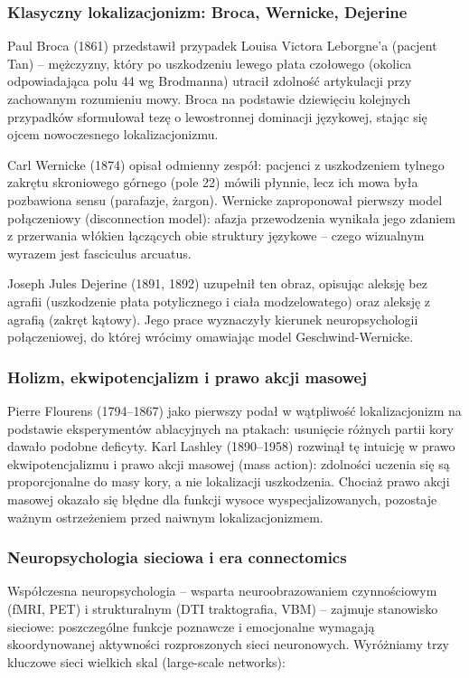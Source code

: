 \documentclass[11pt,a4paper]{article}
\begin{document}
\subsubsection{Klasyczny lokalizacjonizm: Broca, Wernicke, Dejerine}

Paul Broca (1861) przedstawił przypadek Louisa Victora Leborgne'a (pacjent Tan) – mężczyzny, który po
uszkodzeniu lewego płata czołowego (okolica odpowiadająca polu 44 wg Brodmanna) utracił zdolność
artykulacji przy zachowanym rozumieniu mowy. Broca na podstawie dziewięciu kolejnych przypadków
sformułował tezę o lewostronnej dominacji językowej, stając się ojcem nowoczesnego lokalizacjonizmu.

Carl Wernicke (1874) opisał odmienny zespół: pacjenci z uszkodzeniem tylnego zakrętu skroniowego górnego
(pole 22) mówili płynnie, lecz ich mowa była pozbawiona sensu (parafazje, żargon). Wernicke zaproponował
pierwszy model połączeniowy (disconnection model): afazja przewodzenia wynikała jego zdaniem
z przerwania włókien łączących obie struktury językowe – czego wizualnym wyrazem jest fasciculus arcuatus.

Joseph Jules Dejerine (1891, 1892) uzupełnił ten obraz, opisując aleksję bez agrafii (uszkodzenie płata
potylicznego i ciała modzelowatego) oraz aleksję z agrafią (zakręt kątowy). Jego prace wyznaczyły kierunek
neuropsychologii połączeniowej, do której wrócimy omawiając model Geschwind-Wernicke.

\subsubsection{Holizm, ekwipotencjalizm i prawo akcji masowej}

Pierre Flourens (1794–1867) jako pierwszy podał w wątpliwość lokalizacjonizm na podstawie eksperymentów
ablacyjnych na ptakach: usunięcie różnych partii kory dawało podobne deficyty. Karl Lashley (1890–1958)
rozwinął tę intuicję w prawo ekwipotencjalizmu i prawo akcji masowej (mass action): zdolności uczenia się są
proporcjonalne do masy kory, a nie lokalizacji uszkodzenia. Chociaż prawo akcji masowej okazało się błędne
dla funkcji wysoce wyspecjalizowanych, pozostaje ważnym ostrzeżeniem przed naiwnym lokalizacjonizmem.

\subsubsection{Neuropsychologia sieciowa i era connectomics}
Współczesna neuropsychologia – wsparta neuroobrazowaniem czynnościowym (fMRI, PET) i strukturalnym
(DTI traktografia, VBM) – zajmuje stanowisko sieciowe: poszczególne funkcje poznawcze i emocjonalne
wymagają skoordynowanej aktywności rozproszonych sieci neuronowych. Wyróżniamy trzy kluczowe sieci
wielkich skal (large-scale networks):
\end{document}
